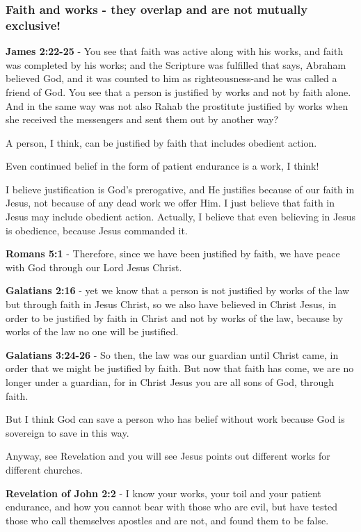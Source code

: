 \documentclass[11pt]{article}
\begin{document}
\subsubsection{Faith and works - they overlap and are \textbf{not} mutually exclusive!}
\label{sec:org2957cca}
\textbf{James 2:22-25} - You see that faith was active along with his works, and faith was completed by his works; and the Scripture was fulfilled that says, Abraham believed God, and it was counted to him as righteousness-and he was called a friend of God. You see that a person is justified by works and not by faith alone. And in the same way was not also Rahab the prostitute justified by works when she received the messengers and sent them out by another way?

A person, I think, can be justified by faith that includes obedient action.

Even continued belief in the form of patient endurance is a work, I think!

I believe justification is God's prerogative, and He justifies because of our faith in Jesus, not because of any dead work we offer Him. I just believe that faith in Jesus may include obedient action.
Actually, I believe that even believing in Jesus is obedience, because Jesus commanded it.

\textbf{Romans 5:1} - Therefore, since we have been justified by faith, we have peace with God through our Lord Jesus Christ.

\textbf{Galatians 2:16} - yet we know that a person is not justified by works of the law but through faith in Jesus Christ, so we also have believed in Christ Jesus, in order to be justified by faith in Christ and not by works of the law, because by works of the law no one will be justified.

\textbf{Galatians 3:24-26} - So then, the law was our guardian until Christ came, in order that we might be justified by faith. But now that faith has come, we are no longer under a guardian, for in Christ Jesus you are all sons of God, through faith.

But I think God can save a person who has belief without work because God is sovereign to save in this way.

Anyway, see Revelation and you will see Jesus points out different works for different churches.

\textbf{Revelation of John 2:2} - I know your works, your toil and your patient endurance, and how you cannot bear with those who are evil, but have tested those who call themselves apostles and are not, and found them to be false.
\end{document}
